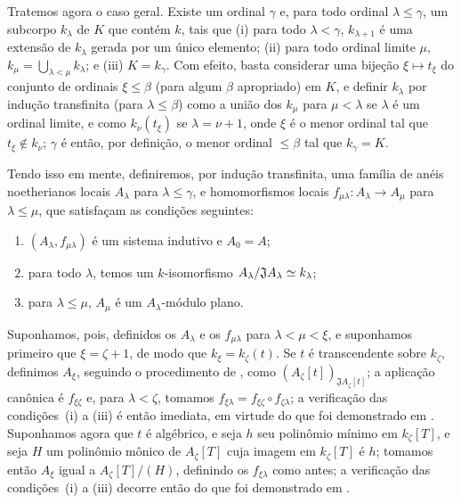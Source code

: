 \begin{env}[10.3.1.4]
\label{0.10.3.1.4}
Tratemos agora o caso geral.
Existe um ordinal $\gamma$ e, para todo ordinal $\lambda\leq\gamma$, um subcorpo $k_\lambda$ de $K$ que contém $k$, tais que (i) para todo $\lambda<\gamma$, $k_{\lambda+1}$ é uma extensão de $k_\lambda$ gerada por um único elemento; (ii) para todo ordinal limite $\mu$, $k_\mu=\bigcup_{\lambda<\mu}k_\lambda$; e (iii) $K=k_\gamma$.
Com efeito, basta considerar uma bijeção $\xi\mapsto t_\xi$ do conjunto de ordinais $\xi\leq\beta$ (para algum $\beta$ apropriado) em $K$, e definir $k_\lambda$ por indução transfinita (para $\lambda\leq\beta$) como a união dos $k_\mu$ para $\mu<\lambda$ se $\lambda$ é um ordinal limite, e como $k_\nu(t_\xi)$ se $\lambda=\nu+1$, onde $\xi$ é o menor ordinal tal que $t_\xi\not\in k_\nu$;
$\gamma$ é então, por definição, o menor ordinal $\leq\beta$ tal que $k_\gamma=K$.

Tendo isso em mente, definiremos, por indução transfinita, uma família de anéis noetherianos locais $A_\lambda$ para $\lambda\leq\gamma$, e homomorfismos locais $f_{\mu\lambda}:A_\lambda\to A_\mu$ para $\lambda\leq\mu$, que satisfaçam as condições seguintes:
\begin{enumerate}
  \item[(i)] $(A_\lambda,f_{\mu\lambda})$ é um sistema indutivo e $A_0=A$;
  \item[(ii)] para todo $\lambda$, temos um $k$-isomorfismo $A_\lambda/\mathfrak{J}A_\lambda\simeq k_\lambda$;
  \item[(iii)] para $\lambda\leq\mu$, $A_\mu$ é um $A_\lambda$-módulo plano.
\end{enumerate}

Suponhamos, pois, definidos os $A_\lambda$ e os $f_{\mu\lambda}$ para $\lambda<\mu<\xi$, e suponhamos primeiro que $\xi=\zeta+1$, de modo que $k_\xi=k_\zeta(t)$.
Se $t$ é transcendente sobre $k_\zeta$, definimos $A_\xi$, seguindo o procedimento de , como $(A_\zeta[t])_{\mathfrak{J}A_\zeta[t]}$;
a aplicação canônica é $f_{\xi\zeta}$ e, para $\lambda<\zeta$, tomamos $f_{\xi\lambda}=f_{\xi\zeta}\circ f_{\zeta\lambda}$;
a verificação das condições~(i) a (iii) é então imediata, em virtude do que foi demonstrado em .
Suponhamos agora que $t$ é algébrico, e seja $h$ seu polinômio mínimo em $k_\zeta[T]$, e seja $H$ um polinômio mônico de $A_\zeta[T]$ cuja imagem em $k_\zeta[T]$ é $h$;
tomamos então $A_\xi$ igual a $A_\zeta[T]/(H)$, definindo os $f_{\xi\lambda}$ como antes;
a verificação das condições~(i) a (iii) decorre então do que foi demonstrado em .


\end{env}
